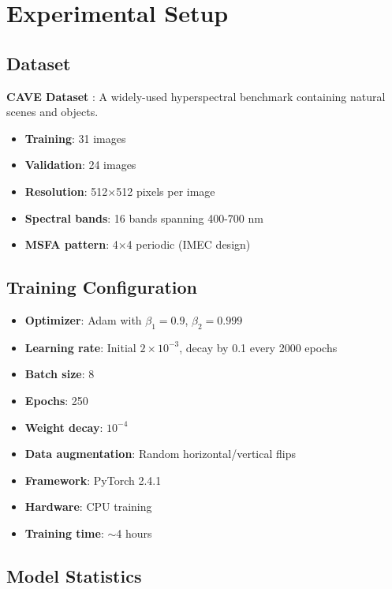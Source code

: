 \documentclass[conference]{IEEEtran}
\begin{document}
\section{Experimental Setup}

\subsection{Dataset}

\textbf{CAVE Dataset} \cite{b7}: A widely-used hyperspectral benchmark containing natural scenes and objects.
\begin{itemize}
    \item \textbf{Training}: 31 images
    \item \textbf{Validation}: 24 images
    \item \textbf{Resolution}: 512×512 pixels per image
    \item \textbf{Spectral bands}: 16 bands spanning 400-700 nm
    \item \textbf{MSFA pattern}: 4×4 periodic (IMEC design)
\end{itemize}

\subsection{Training Configuration}

\begin{itemize}
    \item \textbf{Optimizer}: Adam with $\beta_1=0.9$, $\beta_2=0.999$
    \item \textbf{Learning rate}: Initial $2 \times 10^{-3}$, decay by 0.1 every 2000 epochs
    \item \textbf{Batch size}: 8
    \item \textbf{Epochs}: 250
    \item \textbf{Weight decay}: $10^{-4}$
    \item \textbf{Data augmentation}: Random horizontal/vertical flips
    \item \textbf{Framework}: PyTorch 2.4.1
    \item \textbf{Hardware}: CPU training
    \item \textbf{Training time}: $\sim$4 hours
\end{itemize}

\subsection{Model Statistics}
\end{document}
